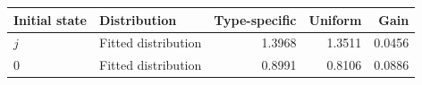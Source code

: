 \begin{tabular}{llrrr}\toprule
Initial state & Distribution & Type-specific & Uniform & Gain\\\midrule
$j$ & Fitted distribution & 1.3968 & 1.3511 & 0.0456 \\
$0$ & Fitted distribution & 0.8991 & 0.8106 & 0.0886 \\
\bottomrule\end{tabular}
